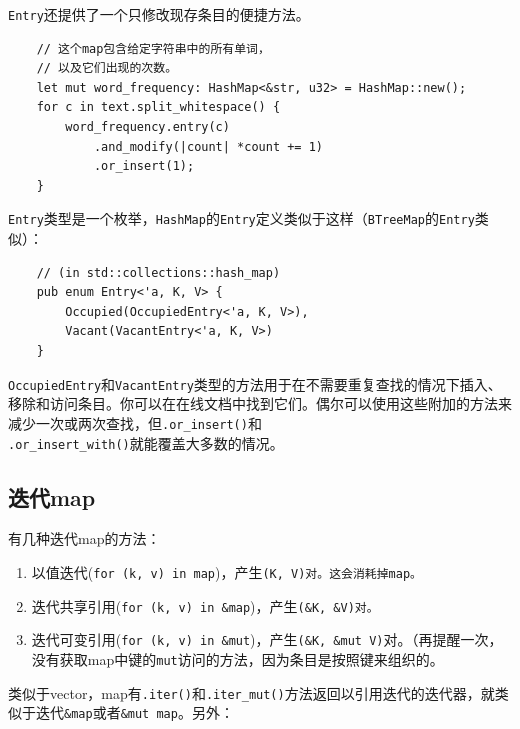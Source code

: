 \texttt{Entry}还提供了一个只修改现存条目的便捷方法。


\begin{verbatim}
    // 这个map包含给定字符串中的所有单词，
    // 以及它们出现的次数。
    let mut word_frequency: HashMap<&str, u32> = HashMap::new();
    for c in text.split_whitespace() {
        word_frequency.entry(c)
            .and_modify(|count| *count += 1)
            .or_insert(1);
    }
\end{verbatim}

\texttt{Entry}类型是一个枚举，\texttt{HashMap}的\texttt{Entry}定义类似于这样（\texttt{BTreeMap}的\texttt{Entry}类似）：
\begin{verbatim}
    // (in std::collections::hash_map)
    pub enum Entry<'a, K, V> {
        Occupied(OccupiedEntry<'a, K, V>),
        Vacant(VacantEntry<'a, K, V>)
    }
\end{verbatim}

\texttt{OccupiedEntry}和\texttt{VacantEntry}类型的方法用于在不需要重复查找的情况下插入、移除和访问条目。你可以在在线文档中找到它们。偶尔可以使用这些附加的方法来减少一次或两次查找，但\texttt{.or\_insert()}和\\
\texttt{.or\_insert\_with()}就能覆盖大多数的情况。

\subsection{迭代map}
有几种迭代map的方法：
\begin{enumerate}
    \item 以值迭代(\texttt{for (k, v) in map})，产生\texttt{(K, V)对。这会消耗掉map。}
    \item 迭代共享引用(\texttt{for (k, v) in \&map})，产生\texttt{(\&K, \&V)对。}
    \item 迭代可变引用(\texttt{for (k, v) in \&mut})，产生\texttt{(\&K, \&mut V)}对。（再提醒一次，没有获取map中键的\texttt{mut}访问的方法，因为条目是按照键来组织的。
\end{enumerate}

类似于vector，map有\texttt{.iter()}和\texttt{.iter\_mut()}方法返回以引用迭代的迭代器，就类似于迭代\texttt{\&map}或者\texttt{\&mut map}。另外：

